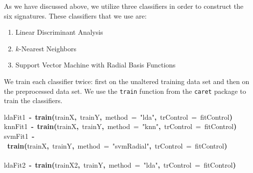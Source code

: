 \documentclass{article}
\makeatletter
\newcommand{\hlfunctioncall}[1]{\textcolor[rgb]{.5,0,.33}{\textbf{#1}}}%
\newcommand{\hlstring}[1]{\textcolor[rgb]{.6,.6,1}{#1}}%
\newcommand{\hlkeyword}[1]{\textbf{#1}}%
\newcommand{\hlargument}[1]{\textcolor[rgb]{.69,.25,.02}{#1}}%
\newcommand{\hlassignement}[1]{\textbf{#1}}%
\newcommand{\hlsymbol}[1]{#1}%
\newcommand{\hlstd}[1]{\textcolor[rgb]{0,0,0}{#1}}%
\newenvironment{kframe}{%
 \def\FrameCommand##1{\hskip\@totalleftmargin \hskip-\fboxsep
 \colorbox{shadecolor}{##1}\hskip-\fboxsep
     \hskip-\linewidth \hskip-\@totalleftmargin \hskip\columnwidth}%
 \MakeFramed {\advance\hsize-\width
   \@totalleftmargin\z@ \linewidth\hsize
   \@setminipage}}%
 {\par\unskip\endMakeFramed}
\newenvironment{knitrout}{}{} %
\makeatother
\begin{document}
As we have discussed above, we utilize three classifiers in order to construct
the six signatures. These classifiers that we use are:

\begin{enumerate}
  \item Linear Discriminant Analysis
  \item $k$-Nearest Neighbors
  \item Support Vector Machine with Radial Basis Functions
\end{enumerate}

We train each classifier twice: first on the unaltered training data set and
then on the preprocessed data set. We use the {\tt train} function from the
{\tt caret} package to train the classifiers.

\begin{knitrout}
\color{fgcolor}\begin{kframe}
\begin{flushleft}
\ttfamily\noindent
\hlsymbol{ldaFit1}{\ }\hlassignement{\usebox{\hlnormalsizeboxlessthan}-}{\ }\hlfunctioncall{train}\hlkeyword{(}\hlsymbol{trainX}\hlkeyword{,}{\ }\hlsymbol{trainY}\hlkeyword{,}{\ }\hlargument{method}{\ }\hlargument{=}{\ }\hlstring{"{}lda"{}}\hlkeyword{,}{\ }\hlargument{trControl}{\ }\hlargument{=}{\ }\hlsymbol{fitControl}\hlkeyword{)}\hspace*{\fill}\\
\hlstd{}\hlsymbol{knnFit1}{\ }\hlassignement{\usebox{\hlnormalsizeboxlessthan}-}{\ }\hlfunctioncall{train}\hlkeyword{(}\hlsymbol{trainX}\hlkeyword{,}{\ }\hlsymbol{trainY}\hlkeyword{,}{\ }\hlargument{method}{\ }\hlargument{=}{\ }\hlstring{"{}knn"{}}\hlkeyword{,}{\ }\hlargument{trControl}{\ }\hlargument{=}{\ }\hlsymbol{fitControl}\hlkeyword{)}\hspace*{\fill}\\
\hlstd{}\hlsymbol{svmFit1}{\ }\hlassignement{\usebox{\hlnormalsizeboxlessthan}-}{\ }\hlfunctioncall{train}\hlkeyword{(}\hlsymbol{trainX}\hlkeyword{,}{\ }\hlsymbol{trainY}\hlkeyword{,}{\ }\hlargument{method}{\ }\hlargument{=}{\ }\hlstring{"{}svmRadial"{}}\hlkeyword{,}{\ }\hlargument{trControl}{\ }\hlargument{=}{\ }\hlsymbol{fitControl}\hlkeyword{)}\hspace*{\fill}\\
\hlstd{}\hspace*{\fill}\\
\hlstd{}\hlsymbol{ldaFit2}{\ }\hlassignement{\usebox{\hlnormalsizeboxlessthan}-}{\ }\hlfunctioncall{train}\hlkeyword{(}\hlsymbol{trainX2}\hlkeyword{,}{\ }\hlsymbol{trainY}\hlkeyword{,}{\ }\hlargument{method}{\ }\hlargument{=}{\ }\hlstring{"{}lda"{}}\hlkeyword{,}{\ }\hlargument{trControl}{\ }\hlargument{=}{\ }\hlsymbol{fitControl}\hlkeyword{)}\hspace*{\fill}\\

\end{flushleft}
\end{kframe}
\end{knitrout}
\end{document}
